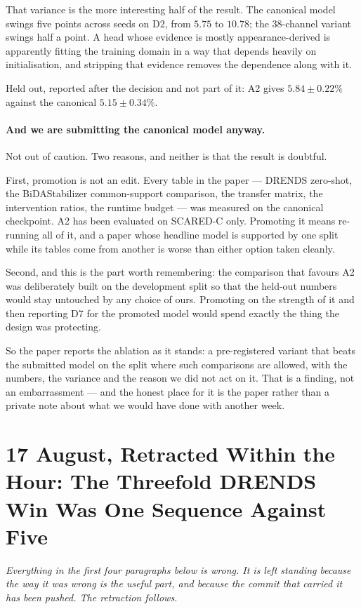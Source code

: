 \documentclass[11pt,a4paper]{article}
\begin{document}
That variance is the more interesting half of the result. The canonical
model swings five points across seeds on D2, from $5.75$ to $10.78$; the
$38$-channel variant swings half a point. A head whose evidence is mostly
appearance-derived is apparently fitting the training domain in a way
that depends heavily on initialisation, and stripping that evidence
removes the dependence along with it.

Held out, reported after the decision and not part of it: A2 gives
$5.84\pm0.22\%$ against the canonical $5.15\pm0.34\%$.

\paragraph{And we are submitting the canonical model anyway.} Not out of
caution. Two reasons, and neither is that the result is doubtful.

First, promotion is not an edit. Every table in the paper --- DRENDS
zero-shot, the BiDAStabilizer common-support comparison, the transfer
matrix, the intervention ratios, the runtime budget --- was measured on
the canonical checkpoint. A2 has been evaluated on SCARED-C only.
Promoting it means re-running all of it, and a paper whose headline model
is supported by one split while its tables come from another is worse
than either option taken cleanly.

Second, and this is the part worth remembering: the comparison that
favours A2 was deliberately built on the development split so that the
held-out numbers would stay untouched by any choice of ours. Promoting on
the strength of it and then reporting D7 for the promoted model would
spend exactly the thing the design was protecting.

So the paper reports the ablation as it stands: a pre-registered variant
that beats the submitted model on the split where such comparisons are
allowed, with the numbers, the variance and the reason we did not act on
it. That is a finding, not an embarrassment --- and the honest place for
it is the paper rather than a private note about what we would have done
with another week.


\section*{17 August, Retracted Within the Hour: The Threefold DRENDS Win
Was One Sequence Against Five}

\emph{Everything in the first four paragraphs below is wrong. It is left
standing because the way it was wrong is the useful part, and because the
commit that carried it has been pushed. The retraction follows.}
\end{document}
